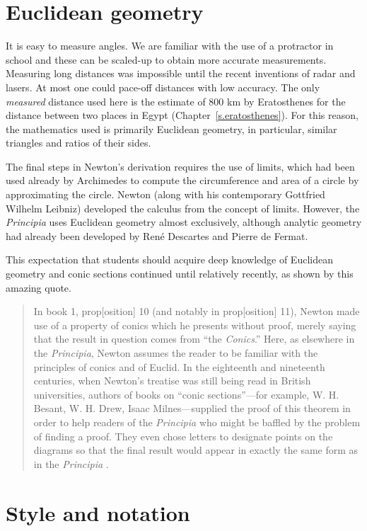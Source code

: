\section*{Euclidean geometry}

It is easy to measure angles. We are familiar with the use of a protractor in school and these can be scaled-up to obtain more accurate measurements. Measuring long distances was impossible until the recent inventions of radar and lasers. At most one could pace-off distances with low accuracy. The only \emph{measured} distance used here is the estimate of $800$ km by Eratosthenes for the distance between two places in Egypt (Chapter~\ref{s.eratosthenes}). For this reason, the mathematics used is primarily Euclidean geometry, in particular, similar triangles and ratios of their sides.

The final steps in Newton's derivation requires the use of limits, which had been used already by Archimedes to compute the circumference and area of a circle by approximating the circle. Newton (along with his contemporary Gottfried Wilhelm Leibniz) developed the calculus from the concept of limits. However, the \textit{Principia} uses Euclidean geometry almost exclusively, although analytic geometry had already been developed by René Descartes and Pierre de Fermat.

This expectation that students should acquire deep knowledge of Euclidean geometry and conic sections continued until relatively recently, as shown by this amazing quote.
\begin{quote}
In book 1, prop[osition] 10 (and notably in prop[osition] 11), Newton made use of a property of conics which he presents without proof, merely saying that the result in question comes from ``the \textit{Conics}.'' Here, as elsewhere in the \textit{Principia}, Newton assumes the reader to be familiar with the principles of conics and of Euclid. In the eighteenth and nineteenth centuries, when Newton's treatise was still being read in British universities, authors of books on ``conic sections''---for example, W. H. Besant, W. H. Drew, Isaac Milnes---supplied the proof of this theorem in order to help readers of the \textit{Principia} who might be baffled by the problem of finding a proof. They even chose letters to designate points on the diagrams so that the final result would appear in exactly the same form as in the \textit{Principia} \cite[p.~330]{newton-cohen}.
\end{quote}

\section*{Style and notation}

